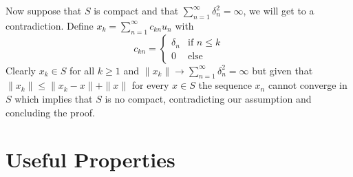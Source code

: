 \documentclass{article}
\begin{document}
\begin{exercise}
\bigbreak

Now suppose that $S$ is compact and that $\sum_{n=1}^{\infty} \delta_n^2 = \infty $, we will get to a contradiction. Define $x_k = \sum_{n=1}^{\infty} c_{kn}u_n $ with
\[
    c_{kn} = 
    \begin{cases}
        \delta_n & \text{if } n \le k \\
        0 & \text{else}
    \end{cases}
\]
Clearly $x_k \in S$ for all $k \ge 1$  and $\|x_k\| \rightarrow \sum_{n=1}^{\infty} \delta_n^2 = \infty$ but given that $\|x_k\| \le \|x_k-x\| + \|x\|$ for every $x \in S$ the sequence $x_n$ cannot converge in $S$ which implies that $S$ is no compact, contradicting our assumption and concluding the proof.  
\end{exercise}

\section*{Useful Properties}
\end{document}
